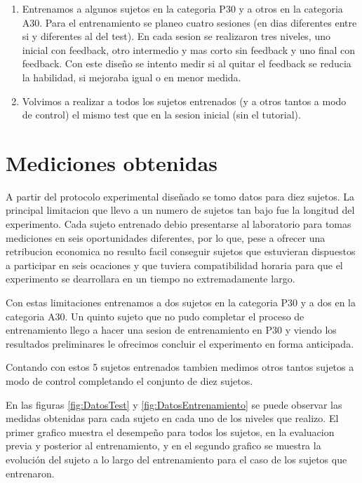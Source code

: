 \documentclass{article}
\begin{document}
\begin{enumerate}
    \item Entrenamos a algunos sujetos en la categoria P30 y a otros en la categoria A30. Para el entrenamiento se planeo cuatro sesiones (en dias diferentes entre si y diferentes al del test). En cada sesion se realizaron tres niveles, uno inicial con feedback, otro intermedio y mas corto sin feedback y uno final con feedback. Con este diseño se intento medir si al quitar el feedback se reducia la habilidad, si mejoraba igual o en menor medida. 
    
    \item Volvimos a realizar a todos los sujetos entrenados (y a otros tantos a modo de control) el mismo test que en la sesion inicial (sin el tutorial). 
    
\end{enumerate}

\section{Mediciones obtenidas}

    A partir del protocolo experimental diseñado se tomo datos para diez sujetos. La principal limitacion que llevo a un numero de sujetos tan bajo fue la longitud del experimento. Cada sujeto entrenado debio presentarse al laboratorio para tomas mediciones en seis oportunidades diferentes, por lo que, pese a ofrecer una retribucion economica no resulto facil conseguir sujetos que estuvieran dispuestos a participar en seis ocaciones y que tuviera compatibilidad horaria para que el experimento se dearrollara en un tiempo no extremadamente largo. 
    
    Con estas limitaciones entrenamos a dos sujetos en la categoria P30 y a dos en la categoria A30. Un quinto sujeto que no pudo completar el proceso de entrenamiento llego a hacer una sesion de entrenamiento en P30 y viendo los resultados preliminares le ofrecimos concluir el experimento en forma anticipada.
    
    Contando con estos 5 sujetos entrenados tambien medimos otros tantos sujetos a modo de control completando el conjunto de diez sujetos. 
    
    En las figuras \ref{fig:DatosTest} y \ref{fig:DatosEntrenamiento} se puede observar las medidas obtenidas para cada sujeto en cada uno de los niveles que realizo. El primer grafico muestra el desempeño para todos los sujetos, en la evaluacion previa y posterior al entrenamiento, y en el segundo grafico se muestra la evolución del sujeto a lo largo del entrenamiento para el caso de los sujetos que entrenaron.
    
\end{document}
